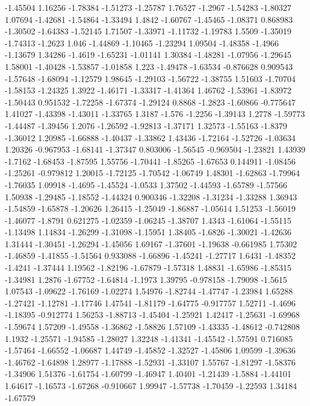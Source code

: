 \documentclass[9pt]{article}
\theoremstyle{plain}
\theoremstyle{definition}
\theoremstyle{remark}
\numberwithin{equation}{section}
\begin{document}
-1.45504
1.16256
-1.78384
-1.51273
-1.25787
1.76527
-1.2967
-1.54283
-1.80327
1.07694
-1.42681
-1.54864
-1.33494
1.4842
-1.60767
-1.45465
-1.08371
0.868983
-1.30502
-1.64383
-1.52145
1.71507
-1.33971
-1.11732
-1.19783
1.5509
-1.35019
-1.74313
-1.2623
1.046
-1.44869
-1.10465
-1.23294
1.09504
-1.48358
-1.4966
-1.13679
1.34286
-1.4619
-1.65231
-1.01141
1.30384
-1.48281
-1.07956
-1.29645
1.58001
-1.40428
-1.53857
-1.01858
1.223
-1.49478
-1.63534
-0.876628
0.909543
-1.57648
-1.68094
-1.12579
1.98645
-1.29103
-1.56722
-1.38755
1.51603
-1.70704
-1.58153
-1.24325
1.3922
-1.46171
-1.33317
-1.41364
1.46762
-1.53961
-1.83972
-1.50443
0.951532
-1.72258
-1.67374
-1.29124
0.8868
-1.2823
-1.60866
-0.775647
1.41027
-1.43398
-1.43011
-1.33765
1.3187
-1.576
-1.2256
-1.39143
1.2778
-1.59773
-1.44487
-1.39456
1.2076
-1.26592
-1.92813
-1.37171
1.32573
-1.55163
-1.8379
-1.36012
1.20985
-1.66888
-1.40437
-1.33862
1.43436
-1.72164
-1.52726
-1.03634
1.20326
-0.967953
-1.68141
-1.37347
0.803006
-1.56545
-0.969504
-1.23821
1.43939
-1.7162
-1.68453
-1.87595
1.55756
-1.70441
-1.85265
-1.67653
0.144911
-1.08456
-1.25261
-0.979812
1.20015
-1.72125
-1.70542
-1.06749
1.48301
-1.62863
-1.79964
-1.76035
1.09918
-1.4695
-1.45524
-1.0533
1.37502
-1.44593
-1.65789
-1.57566
1.50938
-1.29485
-1.18552
-1.44324
0.900346
-1.32208
-1.31234
-1.33288
1.36943
-1.54859
-1.65878
-1.20626
1.26415
-1.25049
-1.86887
-1.05614
1.51253
-1.56019
-1.46077
-1.8791
0.621275
-1.02359
-1.06245
-1.38707
1.4343
-1.61064
-1.55115
-1.13498
1.14834
-1.26299
-1.31098
-1.15951
1.38405
-1.6826
-1.30021
-1.42636
1.31444
-1.30451
-1.26294
-1.45056
1.69167
-1.37601
-1.19638
-0.661985
1.75302
-1.46859
-1.41855
-1.51564
0.933088
-1.66896
-1.45241
-1.27717
1.6431
-1.48352
-1.4241
-1.37444
1.19562
-1.82196
-1.67879
-1.57318
1.48831
-1.65986
-1.85315
-1.34981
1.2876
-1.67752
-1.64814
-1.1973
1.39795
-0.978158
-1.79098
-1.5615
1.07543
-1.09622
-1.76169
-1.02274
1.54976
-1.82744
-1.47747
-1.23984
1.65288
-1.27421
-1.12781
-1.17746
1.47541
-1.81179
-1.64775
-0.917757
1.52711
-1.4696
-1.18395
-0.912774
1.56253
-1.88713
-1.45404
-1.25921
1.42417
-1.25631
-1.69968
-1.59674
1.57209
-1.49558
-1.36862
-1.58826
1.57109
-1.43335
-1.48612
-0.742808
1.1932
-1.25571
-1.94585
-1.28027
1.32248
-1.41341
-1.45542
-1.57591
0.716085
-1.57464
-1.66552
-1.06687
1.44749
-1.45852
-1.32527
-1.45806
1.09599
-1.39636
-1.46762
-1.64898
1.28977
-1.17888
-1.52931
-1.33107
1.55767
-1.81297
-1.58376
-1.34906
1.51376
-1.61754
-1.60799
-1.46947
1.40401
-1.21439
-1.5884
-1.44101
1.64617
-1.16573
-1.67268
-0.910667
1.99947
-1.57738
-1.70459
-1.22593
1.34184
-1.67579
\end{document}
